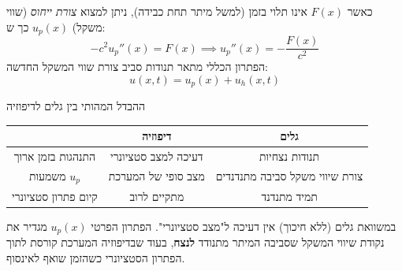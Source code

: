 כאשר $F(x)$ אינו תלוי בזמן (למשל מיתר תחת כבידה), ניתן למצוא \emph{צורת ייחוס} (שווי משקל) $u_p(x)$ כך ש:
\[
-c^2u_p''(x)=F(x) \implies \boxed{u_p''(x) = -\frac{F(x)}{c^2}}
\]
הפתרון הכללי מתאר תנודות סביב צורת שווי המשקל החדשה:
\[
u(x,t)=u_p(x)+u_h(x,t)
\]

\begin{resultbox}{ההבדל המהותי בין גלים לדיפוזיה}
\begin{center}
\renewcommand{\arraystretch}{1.5}
\begin{tabular}{|c|c|c|}
\hline
& \textbf{דיפוזיה} & \textbf{גלים} \\
\hline
התנהגות בזמן ארוך & דעיכה למצב סטציונרי & תנודות נצחיות \\
\hline
משמעות $u_p$ & מצב סופי של המערכת & צורת שיווי משקל סביבה מתנדנדים \\
\hline
קיום פתרון סטציונרי & מתקיים לרוב & תמיד מתנדנד \\
\hline
\end{tabular}
\end{center}

במשוואת גלים (ללא חיכוך) אין דעיכה ל"מצב סטציונרי". הפתרון הפרטי $u_p(x)$ מגדיר את נקודת שיווי המשקל שסביבה המיתר מתנודד \textbf{לנצח}, בעוד שבדיפוזיה המערכת קורסת לתוך הפתרון הסטציונרי כשהזמן שואף לאינסוף.
\end{resultbox}


